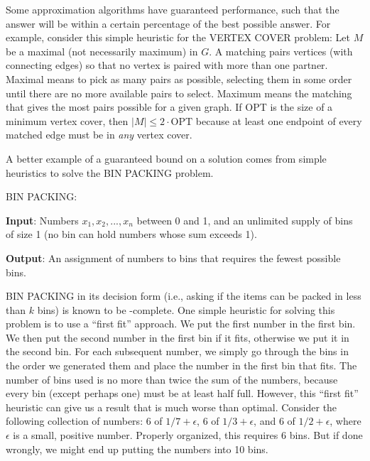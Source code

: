 Some approximation algorithms have guaranteed performance,
such that the answer will be within a certain
percentage of the best possible answer.
For example, consider this simple heuristic for the VERTEX COVER
problem:
Let \(M\) be a maximal (not necessarily maximum) 
in \(G\).
A matching pairs vertices (with connecting edges) so that no
vertex is paired with more than one partner.
Maximal means to pick as many pairs as possible, selecting them in
some order until there are no more available pairs to select.
Maximum means the matching that gives the most pairs possible for a
given graph.
If OPT is the size of a minimum vertex cover, then
\(|M| \leq 2 \cdot \mbox{OPT}\)
because at least one endpoint of every matched edge must be in
\emph{any} vertex cover.

A better example of a guaranteed bound on a solution comes
from simple heuristics to solve the BIN PACKING
problem.

\begin{inbox}
\noindent BIN PACKING:

\textbf{Input}: Numbers \(x_1, x_2, ..., x_n\) between 0 and 1, and an
unlimited supply of bins of size 1
(no bin can hold numbers whose sum exceeds 1).

\textbf{Output}: An assignment of numbers to bins that requires the
fewest possible bins.
\end{inbox}

BIN PACKING in its decision form (i.e., asking if the items can be
packed in less than $k$ bins) is known to be \NP-complete.
One simple heuristic for solving this problem is to use a ``first
fit'' approach.
We put the first number in the first bin.
We then put the second number in the first bin if it fits, otherwise
we put it in the second bin.
For each subsequent number, we simply go through the bins in the order
we generated them and place the number in the first bin that fits.
The number of bins used is no more than twice the sum of the
numbers, because every bin (except perhaps one) must be at least half
full.
However, this ``first fit'' heuristic can give us a result that is
much worse than optimal.
Consider the following collection of numbers: 6 of \(1/7 + \epsilon\),
6 of \(1/3 + \epsilon\), and 6 of \(1/2 + \epsilon\), where
\(\epsilon\) is a small, positive number.
Properly organized, this requires 6 bins.
But if done wrongly, we might end up putting the numbers into 10 bins.

